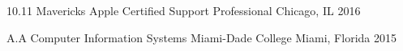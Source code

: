 

\begin{cventries}

	\cventry
	{10.11 Mavericks} %
	{Apple Certified Support Professional} %
	{Chicago, IL} %
	{2016} %
	{
	}

	\cventry
	{A.A Computer Information Systems} %
	{Miami-Dade College} %
	{Miami, Florida} %
	{2015} %
	{
	}


\end{cventries}
